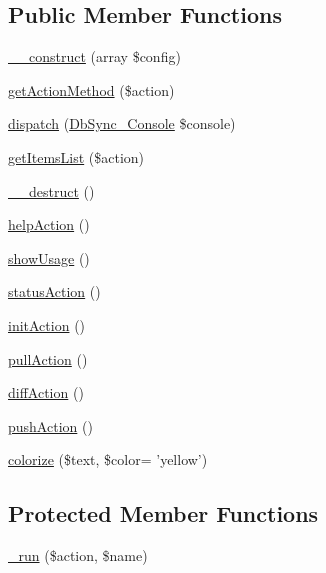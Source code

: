 \subsection*{Public Member Functions}
\begin{DoxyCompactItemize}
\item 
\hyperlink{classDbSync__Controller__AbstractController_a6afb890b457d835ce2fc37177a73268c}{\_\-\_\-construct} (array \$config)
\item 
\hyperlink{classDbSync__Controller__AbstractController_a7a3b608e12b8e9d3de6def607c0cbe28}{getActionMethod} (\$action)
\item 
\hyperlink{classDbSync__Controller__AbstractController_a26c95d326895bcad46f6b61a3674f5c6}{dispatch} (\hyperlink{classDbSync__Console}{DbSync\_\-Console} \$console)
\item 
\hyperlink{classDbSync__Controller__AbstractController_ac07432b2dbe3854b4f7924fa7887215c}{getItemsList} (\$action)
\item 
\hyperlink{classDbSync__Controller__AbstractController_a40107b1c2a0d5e2f3da236a5c32c2f93}{\_\-\_\-destruct} ()
\item 
\hyperlink{classDbSync__Controller__AbstractController_aaffa31e72a2dcdd6d2a144b8000e7231}{helpAction} ()
\item 
\hyperlink{classDbSync__Controller__AbstractController_aa27d714cc779879c43ca3621c65c65de}{showUsage} ()
\item 
\hyperlink{classDbSync__Controller__AbstractController_a12b74400d214770030c52d2f29308f52}{statusAction} ()
\item 
\hyperlink{classDbSync__Controller__AbstractController_ae973fdc065acffa90f43425b2d480794}{initAction} ()
\item 
\hyperlink{classDbSync__Controller__AbstractController_ab0e568570a013d19ba46b44c4e1e4aa4}{pullAction} ()
\item 
\hyperlink{classDbSync__Controller__AbstractController_a94bd514ad322a37bf6bf2158b98b69b7}{diffAction} ()
\item 
\hyperlink{classDbSync__Controller__AbstractController_a92abb57b71e100a6c771f8a54b6e2225}{pushAction} ()
\item 
\hyperlink{classDbSync__Controller__AbstractController_abcec7de3ac2e1a43ff35ec2190a9c8d3}{colorize} (\$text, \$color= 'yellow')
\end{DoxyCompactItemize}
\subsection*{Protected Member Functions}
\begin{DoxyCompactItemize}
\item 
\hyperlink{classDbSync__Controller__AbstractController_ae7f065286125487dd51f268138c02113}{\_\-run} (\$action, \$name)
\end{DoxyCompactItemize}
